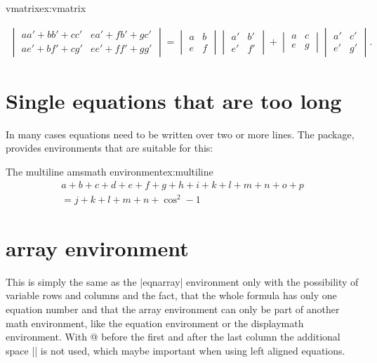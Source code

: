 \begin{texexample}{vmatrix}{ex:vmatrix}

\begin{gather}
\begin{vmatrix}
aa' + bb' + cc' & ea' + fb' + gc' \\
ae' + bf' + cg' & ee' + ff' + gg'
\end{vmatrix}
{} = \begin{vmatrix}
a & b \\
e & f
\end{vmatrix}  \begin{vmatrix}
a' & b' \\
e' & f'
\end{vmatrix} + \begin{vmatrix}
a & c \\
e & g
\end{vmatrix}  \begin{vmatrix}
a' & c' \\
e' & g'
\end{vmatrix}.
\end{gather}
\end{texexample}





\section{Single equations that are too long}

In many cases equations need to be written over two or more lines. The  package, provides environments that are suitable for this:


\begin{texexample}{The multiline amsmath environment}{ex:multiline}
\begin{multline}
   a + b + c + d + e + f+ g + h + i  + k + l + m + n + o + p\\
              = j + k + l + m + n +\cos^{2}-1
\end{multline}
\end{texexample}



\newpage


\section{array environment}

This is simply the same as the |eqnarray| environment only with the possibility of
variable rows and columns and the fact, that the whole formula has only one
equation number and that the array environment can only be part of another math
environment, like the equation environment or the displaymath environment. With
@{} before the first and after the last column the additional space |\arraycolsep| is
not used, which maybe important when using left aligned equations.

